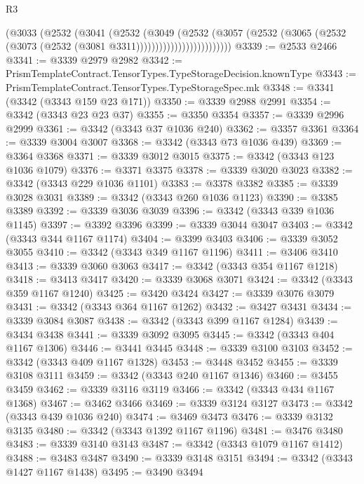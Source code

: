 \begin{lexlean}{R3}
\begin{coremodule}
                            (@3033
                              (@2532
                                (@3041
                                  (@2532
                                    (@3049
                                      (@2532
                                        (@3057
                                          (@2532
                                            (@3065
                                              (@2532
                                                (@3073 (@2532 (@3081 @3311)))))))))))))))))))))))))
@3339 := @2533 @2466
@3341 := @3339 @2979 @2982
@3342 := PrismTemplateContract.TensorTypes.TypeStorageDecision.knownType
@3343 := PrismTemplateContract.TensorTypes.TypeStorageSpec.mk
@3348 := @3341 (@3342 (@3343 @159 @23 @171))
@3350 := @3339 @2988 @2991
@3354 := @3342 (@3343 @23 @23 @37)
@3355 := @3350 @3354
@3357 := @3339 @2996 @2999
@3361 := @3342 (@3343 @37 @1036 @240)
@3362 := @3357 @3361
@3364 := @3339 @3004 @3007
@3368 := @3342 (@3343 @73 @1036 @439)
@3369 := @3364 @3368
@3371 := @3339 @3012 @3015
@3375 := @3342 (@3343 @123 @1036 @1079)
@3376 := @3371 @3375
@3378 := @3339 @3020 @3023
@3382 := @3342 (@3343 @229 @1036 @1101)
@3383 := @3378 @3382
@3385 := @3339 @3028 @3031
@3389 := @3342 (@3343 @260 @1036 @1123)
@3390 := @3385 @3389
@3392 := @3339 @3036 @3039
@3396 := @3342 (@3343 @339 @1036 @1145)
@3397 := @3392 @3396
@3399 := @3339 @3044 @3047
@3403 := @3342 (@3343 @344 @1167 @1174)
@3404 := @3399 @3403
@3406 := @3339 @3052 @3055
@3410 := @3342 (@3343 @349 @1167 @1196)
@3411 := @3406 @3410
@3413 := @3339 @3060 @3063
@3417 := @3342 (@3343 @354 @1167 @1218)
@3418 := @3413 @3417
@3420 := @3339 @3068 @3071
@3424 := @3342 (@3343 @359 @1167 @1240)
@3425 := @3420 @3424
@3427 := @3339 @3076 @3079
@3431 := @3342 (@3343 @364 @1167 @1262)
@3432 := @3427 @3431
@3434 := @3339 @3084 @3087
@3438 := @3342 (@3343 @399 @1167 @1284)
@3439 := @3434 @3438
@3441 := @3339 @3092 @3095
@3445 := @3342 (@3343 @404 @1167 @1306)
@3446 := @3441 @3445
@3448 := @3339 @3100 @3103
@3452 := @3342 (@3343 @409 @1167 @1328)
@3453 := @3448 @3452
@3455 := @3339 @3108 @3111
@3459 := @3342 (@3343 @240 @1167 @1346)
@3460 := @3455 @3459
@3462 := @3339 @3116 @3119
@3466 := @3342 (@3343 @434 @1167 @1368)
@3467 := @3462 @3466
@3469 := @3339 @3124 @3127
@3473 := @3342 (@3343 @439 @1036 @240)
@3474 := @3469 @3473
@3476 := @3339 @3132 @3135
@3480 := @3342 (@3343 @1392 @1167 @1196)
@3481 := @3476 @3480
@3483 := @3339 @3140 @3143
@3487 := @3342 (@3343 @1079 @1167 @1412)
@3488 := @3483 @3487
@3490 := @3339 @3148 @3151
@3494 := @3342 (@3343 @1427 @1167 @1438)
@3495 := @3490 @3494

\end{coremodule}
\end{lexlean}
